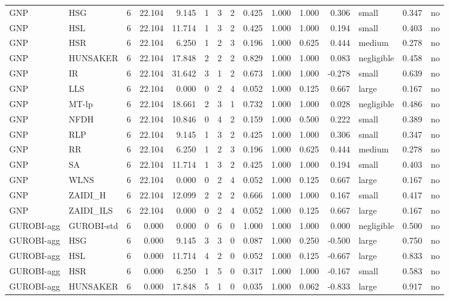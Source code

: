 \begin{table}[htbp]
\begin{tabular}{llrrrrrrrrrrlrr}
GNP & HSG & 6 & 22.104 & 9.145 & 1 & 3 & 2 & 0.425 & 1.000 & 1.000 & 0.306 & small & 0.347 & no \\
GNP & HSL & 6 & 22.104 & 11.714 & 1 & 3 & 2 & 0.425 & 1.000 & 1.000 & 0.194 & small & 0.403 & no \\
GNP & HSR & 6 & 22.104 & 6.250 & 1 & 2 & 3 & 0.196 & 1.000 & 0.625 & 0.444 & medium & 0.278 & no \\
GNP & HUNSAKER & 6 & 22.104 & 17.848 & 2 & 2 & 2 & 0.829 & 1.000 & 1.000 & 0.083 & negligible & 0.458 & no \\
GNP & IR & 6 & 22.104 & 31.642 & 3 & 1 & 2 & 0.673 & 1.000 & 1.000 & -0.278 & small & 0.639 & no \\
GNP & LLS & 6 & 22.104 & 0.000 & 0 & 2 & 4 & 0.052 & 1.000 & 0.125 & 0.667 & large & 0.167 & no \\
GNP & MT-lp & 6 & 22.104 & 18.661 & 2 & 3 & 1 & 0.732 & 1.000 & 1.000 & 0.028 & negligible & 0.486 & no \\
GNP & NFDH & 6 & 22.104 & 10.846 & 0 & 4 & 2 & 0.159 & 1.000 & 0.500 & 0.222 & small & 0.389 & no \\
GNP & RLP & 6 & 22.104 & 9.145 & 1 & 3 & 2 & 0.425 & 1.000 & 1.000 & 0.306 & small & 0.347 & no \\
GNP & RR & 6 & 22.104 & 6.250 & 1 & 2 & 3 & 0.196 & 1.000 & 0.625 & 0.444 & medium & 0.278 & no \\
GNP & SA & 6 & 22.104 & 11.714 & 1 & 3 & 2 & 0.425 & 1.000 & 1.000 & 0.194 & small & 0.403 & no \\
GNP & WLNS & 6 & 22.104 & 0.000 & 0 & 2 & 4 & 0.052 & 1.000 & 0.125 & 0.667 & large & 0.167 & no \\
GNP & ZAIDI\_H & 6 & 22.104 & 12.099 & 2 & 2 & 2 & 0.666 & 1.000 & 1.000 & 0.167 & small & 0.417 & no \\
GNP & ZAIDI\_ILS & 6 & 22.104 & 0.000 & 0 & 2 & 4 & 0.052 & 1.000 & 0.125 & 0.667 & large & 0.167 & no \\
GUROBI-agg & GUROBI-std & 6 & 0.000 & 0.000 & 0 & 6 & 0 & 1.000 & 1.000 & 1.000 & 0.000 & negligible & 0.500 & no \\
GUROBI-agg & HSG & 6 & 0.000 & 9.145 & 3 & 3 & 0 & 0.087 & 1.000 & 0.250 & -0.500 & large & 0.750 & no \\
GUROBI-agg & HSL & 6 & 0.000 & 11.714 & 4 & 2 & 0 & 0.052 & 1.000 & 0.125 & -0.667 & large & 0.833 & no \\
GUROBI-agg & HSR & 6 & 0.000 & 6.250 & 1 & 5 & 0 & 0.317 & 1.000 & 1.000 & -0.167 & small & 0.583 & no \\
GUROBI-agg & HUNSAKER & 6 & 0.000 & 17.848 & 5 & 1 & 0 & 0.035 & 1.000 & 0.062 & -0.833 & large & 0.917 & no \\

\end{tabular}
\end{table}
